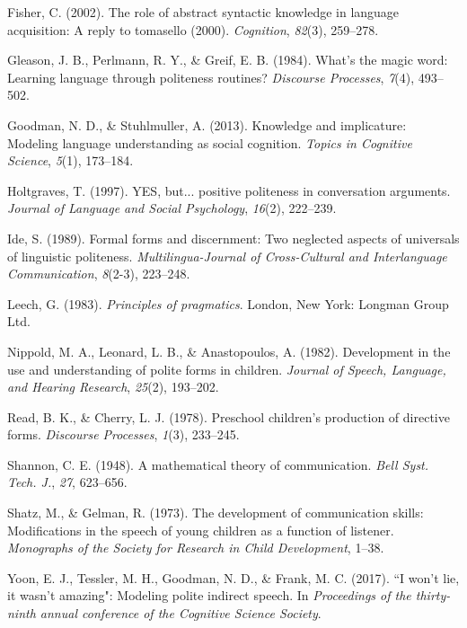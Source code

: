 \documentclass[10pt, letterpaper]{article}
\begin{document}
\hypertarget{ref-fisher2002}{}
Fisher, C. (2002). The role of abstract syntactic knowledge in language
acquisition: A reply to tomasello (2000). \emph{Cognition},
\emph{82}(3), 259--278.

\hypertarget{ref-gleason1984}{}
Gleason, J. B., Perlmann, R. Y., \& Greif, E. B. (1984). What's the
magic word: Learning language through politeness routines?
\emph{Discourse Processes}, \emph{7}(4), 493--502.

\hypertarget{ref-goodman2013}{}
Goodman, N. D., \& Stuhlmuller, A. (2013). Knowledge and implicature:
Modeling language understanding as social cognition. \emph{Topics in
Cognitive Science}, \emph{5}(1), 173--184.

\hypertarget{ref-holtgraves1997}{}
Holtgraves, T. (1997). YES, but... positive politeness in conversation
arguments. \emph{Journal of Language and Social Psychology},
\emph{16}(2), 222--239.

\hypertarget{ref-ide1989}{}
Ide, S. (1989). Formal forms and discernment: Two neglected aspects of
universals of linguistic politeness. \emph{Multilingua-Journal of
Cross-Cultural and Interlanguage Communication}, \emph{8}(2-3),
223--248.

\hypertarget{ref-leech1983}{}
Leech, G. (1983). \emph{Principles of pragmatics}. London, New York:
Longman Group Ltd.

\hypertarget{ref-nippold1982}{}
Nippold, M. A., Leonard, L. B., \& Anastopoulos, A. (1982). Development
in the use and understanding of polite forms in children. \emph{Journal
of Speech, Language, and Hearing Research}, \emph{25}(2), 193--202.

\hypertarget{ref-read1978}{}
Read, B. K., \& Cherry, L. J. (1978). Preschool children's production of
directive forms. \emph{Discourse Processes}, \emph{1}(3), 233--245.

\hypertarget{ref-shannon1948}{}
Shannon, C. E. (1948). A mathematical theory of communication.
\emph{Bell Syst. Tech. J.}, \emph{27}, 623--656.

\hypertarget{ref-shatz1973}{}
Shatz, M., \& Gelman, R. (1973). The development of communication
skills: Modifications in the speech of young children as a function of
listener. \emph{Monographs of the Society for Research in Child
Development}, 1--38.

\hypertarget{ref-yoon2017}{}
Yoon, E. J., Tessler, M. H., Goodman, N. D., \& Frank, M. C. (2017). ``I
won't lie, it wasn't amazing": Modeling polite indirect speech. In
\emph{Proceedings of the thirty-ninth annual conference of the Cognitive
Science Society}.


\end{document}
